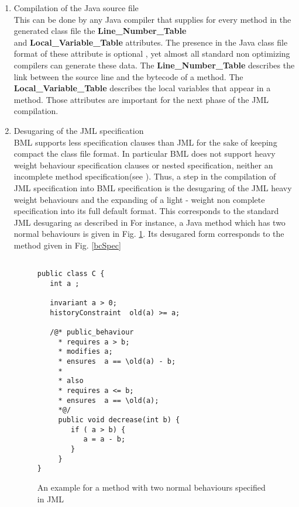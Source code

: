 \begin{enumerate}
\item Compilation of the Java source file \\
  This can be done by any Java compiler that supplies for every method in the generated class file 
the \textbf{Line\_Number\_Table} \\ 
and \textbf{Local\_Variable\_Table}  attributes. The presence in the Java class file format of 
these attribute is optional \cite{VMSpec}, yet almost all standard non optimizing compilers can generate these data. 
The \textbf{Line\_Number\_Table} describes the link between the source line and the bytecode of a method.  
The \textbf{Local\_Variable\_Table} describes the local variables that appear in a method. 
Those attributes are important for the next phase of the JML compilation.

\item Desugaring of the JML specification \\
      BML supports less specification clauses than JML for the sake of keeping compact the class file format.
      In particular BML does not support heavy weight behaviour specification clauses or nested specification, neither an incomplete
      method specification(see  \cite{JMLRefMan}).
      Thus, a step in the compilation of JML specification into BML specification is the desugaring of the JML heavy weight
      behaviours and the expanding of a light - weight non complete specification into its full default format.
      This corresponds to the standard JML desugaring as described  in \cite{RT03djml}
      For instance, a Java method which has two normal behaviours is given in Fig. \ref{JmlSpec}. 
      Its desugared form corresponds to the method given in Fig. \ref{bcSpec}

\begin{figure}
\begin{lstlisting}[frame=trbl]

public class C {
   int a ;

   invariant a > 0; 
   historyConstraint  old(a) >= a;

   /@* public_behaviour
     * requires a > b;
     * modifies a;
     * ensures  a == \old(a) - b;  
     *
     * also
     * requires a <= b;
     * ensures  a == \old(a);
     *@/
     public void decrease(int b) {
        if ( a > b) {
           a = a - b;
        }
     }
}
\end{lstlisting}
\caption{\sc An example for a method with two normal behaviours specified in JML} \label{JmlSpec}
\end{figure}


\end{enumerate}
